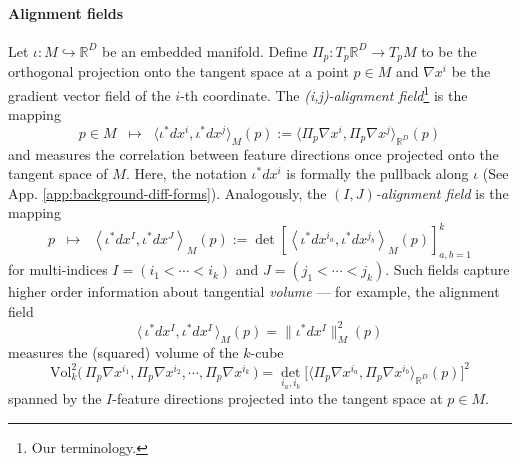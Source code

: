\documentclass{article}
\newcommand{\R}{\mathbb{R}}
\theoremstyle{remark}
\theoremstyle{plain}
\begin{document}
\paragraph{Alignment fields} Let $\iota : M \hookrightarrow \R^D$ be an embedded manifold. Define $\Pi_p : T_p\R^D \to T_pM$ to be the orthogonal projection onto the tangent space at a point $p \in M$ and $\nabla x^i$ be the gradient vector field of the $i$-th coordinate. The \textit{(i,j)-alignment field}\footnote{Our terminology.} is the mapping
\begin{equation} \label{eq:1form-innerprod}
    p \in M \; \; \mapsto \; \; \Big\langle \iota^*dx^i, \iota^*dx^j \Big\rangle_M(p) := \Big\langle \Pi_p \nabla x^i, \Pi_p \nabla x^j \Big\rangle_{\R^D}(p)
\end{equation} and measures the correlation between feature directions once projected onto the tangent space of $M$. Here, the notation $\iota^* dx^i$ is formally the pullback along $\iota$ (See App. \ref{app:background-diff-forms}). Analogously, the \textit{$(I,J)$-alignment field} is the mapping
\begin{equation}
p \; \; \mapsto \; \; \left\langle \iota^* dx^I,\iota^* dx^J \right\rangle_{M}(p)
:=
\det \left[
\left\langle
\iota^* dx^{i_a},
\iota^* dx^{j_b}
\right\rangle_{M}(p)
\right]_{a,b=1}^k
\label{eqn:IJ-alignment-field}
\end{equation} for multi-indices $I=(i_1<\cdots<i_k)$ and $J=(j_1<\cdots<j_k)$. Such fields capture higher order information about tangential \textit{volume} --- for example, the alignment field $$ \big\langle \,\iota^*dx^I, \iota^* dx^I \,\big \rangle_M(p) = \lVert \iota^* dx^I \rVert_M^2(p) $$ measures the (squared) volume of the $k$-cube \begin{equation}
        \text{Vol}_k^2\Big( \,\Pi_p \nabla x^{i_1},\Pi_p \nabla x^{i_2}, \cdots, \Pi_p \nabla x^{i_k} \, \Big) = \det_{i_a,i_b} \Big[ \Big\langle \Pi_p \nabla x^{i_a}, \Pi_p \nabla x^{i_b} \Big\rangle_{\R^D}(p) \Big]^2
\end{equation} spanned by the $I$-feature directions projected into the tangent space at $p \in M$.
\end{document}
